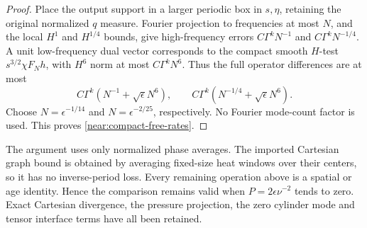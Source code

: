 \begin{proof}
Place the output support in a larger periodic box in \(s,\eta\),
retaining the original normalized \(q\) measure. Fourier projection
to frequencies at most \(N\), and the local \(H^1\) and
\(H^{1/4}\) bounds, give high-frequency errors \(C\Gamma^kN^{-1}\)
and \(C\Gamma^kN^{-1/4}\). A unit low-frequency dual vector corresponds
to the compact smooth \(H\)-test \(s^{3/2}\chi F_Nh\), with
\(H^6\) norm at most \(C\Gamma^kN^6\). Thus the full operator
differences are at most
\[
 C\Gamma^k(N^{-1}+\sqrt\epsilon N^6),\qquad
 C\Gamma^k(N^{-1/4}+\sqrt\epsilon N^6).
\]
Choose \(N=\epsilon^{-1/14}\) and \(N=\epsilon^{-2/25}\), respectively.
No Fourier mode-count factor is used. This proves
\eqref{near:compact-free-rates}.
\end{proof}

The argument uses only normalized phase averages. The imported Cartesian
graph bound is obtained by averaging fixed-size heat windows over their
centers, so it has no inverse-period loss. Every remaining operation
above is a spatial or age identity. Hence the comparison remains valid
when \(P=2\epsilon\nu^{-2}\) tends to zero. Exact Cartesian divergence,
the pressure projection, the zero cylinder mode and tensor interface
terms have all been retained.
